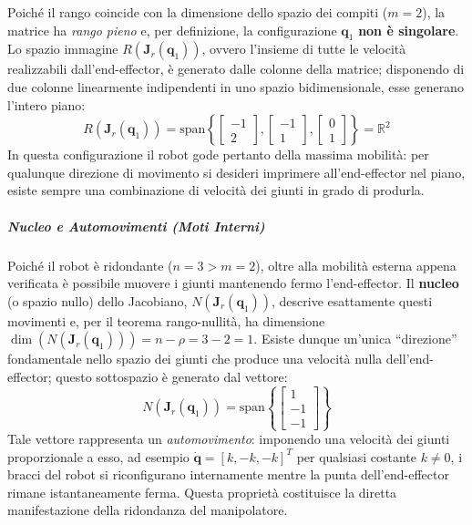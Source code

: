 \documentclass[11pt, a4paper]{report}
\begin{document}
Poiché il rango coincide con la dimensione dello spazio dei compiti ($m=2$), la matrice ha \textit{rango pieno} e, per definizione, la configurazione $\bm{q}_1$ \textbf{non è singolare}. Lo spazio immagine $R(\bm{J}_r(\bm{q}_1))$, ovvero l'insieme di tutte le velocità realizzabili dall'end-effector, è generato dalle colonne della matrice; disponendo di due colonne linearmente indipendenti in uno spazio bidimensionale, esse generano l'intero piano:
\[
    R(\bm{J}_r(\bm{q}_1)) = \mathrm{span}\left\{
    \begin{bmatrix} -1 \\ 2 \end{bmatrix},
    \begin{bmatrix} -1 \\ 1 \end{bmatrix},
    \begin{bmatrix} 0 \\ 1 \end{bmatrix}
    \right\} = \mathbb{R}^{2}
\]
In questa configurazione il robot gode pertanto della massima mobilità: per qualunque direzione di movimento si desideri imprimere all'end-effector nel piano, esiste sempre una combinazione di velocità dei giunti in grado di produrla.

\subparagraph{Nucleo e Automovimenti (Moti Interni)}
Poiché il robot è ridondante ($n=3 > m=2$), oltre alla mobilità esterna appena verificata è possibile muovere i giunti mantenendo fermo l'end-effector. Il \textbf{nucleo} (o spazio nullo) dello Jacobiano, $N(\bm{J}_r(\bm{q}_1))$, descrive esattamente questi movimenti e, per il teorema rango-nullità, ha dimensione $\dim(N(\bm{J}_r(\bm{q}_1))) = n - \rho = 3 - 2 = 1$.
Esiste dunque un'unica ``direzione'' fondamentale nello spazio dei giunti che produce una velocità nulla dell'end-effector; questo sottospazio è generato dal vettore:
\[
    N(\bm{J}_r(\bm{q}_1)) = \mathrm{span}\left\{ \begin{bmatrix} 1 \\ -1 \\ -1 \end{bmatrix} \right\}
\]
Tale vettore rappresenta un \textit{automovimento}: imponendo una velocità dei giunti proporzionale a esso, ad esempio $\dot{\bm{q}} = [k, -k, -k]^T$ per qualsiasi costante $k \neq 0$, i bracci del robot si riconfigurano internamente mentre la punta dell'end-effector rimane istantaneamente ferma. Questa proprietà costituisce la diretta manifestazione della ridondanza del manipolatore.

\newpage
\end{document}

